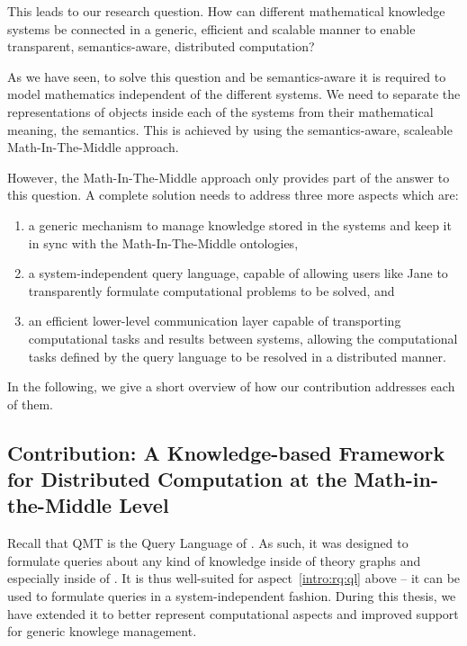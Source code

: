 This leads to our research question. 
How can different mathematical knowledge systems be connected in a generic, efficient and scalable manner to enable transparent, semantics-aware, distributed computation?

As we have seen, to solve this question and be semantics-aware it is required to model mathematics independent of the different systems. 
We need to separate the representations of objects inside each of the systems from their mathematical meaning, the semantics. 
This is achieved by using the semantics-aware, scaleable Math-In-The-Middle approach. 

However, the Math-In-The-Middle approach only provides part of the answer to this question. 
A complete solution needs to address three more aspects which are:
\begin{enumerate}[label={(\roman*)}]
  \item \label{intro:rq:vt} a generic mechanism to manage knowledge stored in the systems and keep it in sync with the Math-In-The-Middle ontologies, 
  \item \label{intro:rq:ql} a system-independent query language, capable of allowing users like Jane to transparently formulate computational problems to be solved, and
  \item \label{intro:rq:com} an efficient lower-level communication layer capable of transporting computational tasks and results between systems, allowing the computational tasks defined by the query language to be resolved in a distributed manner. 
\end{enumerate}

In the following, we give a short overview of how our contribution addresses each of them.

\subsection{Contribution: A Knowledge-based Framework for Distributed Computation at the Math-in-the-Middle Level}\label{sec:intro:com}

Recall that QMT is the Query Language of \mmt. 
As such, it was designed to formulate queries about any kind of knowledge inside of theory graphs and especially inside of \omdocmmt. 
It is thus well-suited for aspect~\ref{intro:rq:ql} above -- it can be used to formulate queries in a system-independent fashion. 
During this thesis, we have extended it to better represent computational aspects and improved support for generic knowlege management. 

